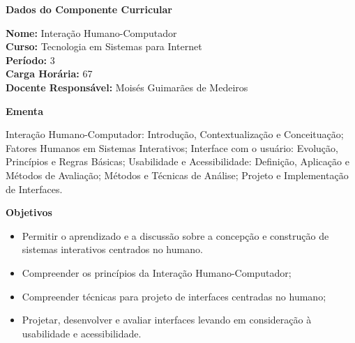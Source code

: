 

\begin{snugshade}\begin{center}\textbf{
    Dados do Componente Curricular
}\end{center}\end{snugshade}

\noindent \textbf{Nome:}                Intera\c{c}\~ao Humano-Computador
\\        \textbf{Curso:}               Tecnologia em Sistemas para Internet
\\        \textbf{Período:}             \unit{3}{\degree}
\\        \textbf{Carga Horária:}       \unit{67}{\hour}
\\        \textbf{Docente Responsável:} Moisés Guimarães de Medeiros


\begin{snugshade}\begin{center}\textbf{
    Ementa
\vphantom{q}}\end{center}\end{snugshade}

\noindent
Interação Humano-Computador: Introdução, Contextualização e Conceituação; Fatores Humanos em Sistemas Interativos; Interface com o usuário: Evolução, Princípios e Regras Básicas; Usabilidade e Acessibilidade: Definição, Aplicação e Métodos de Avaliação; Métodos e Técnicas de Análise; Projeto e Implementação de Interfaces.


\begin{snugshade}\begin{center}\textbf{
    Objetivos
}\end{center}\end{snugshade}

\begin{itemize}

\item Permitir o aprendizado e a discussão sobre a concepção e construção de sistemas interativos centrados no humano.

\item Compreender os princípios da Interação Humano-Computador;

\item Compreender técnicas para projeto de interfaces centradas no humano;

\item Projetar, desenvolver e avaliar interfaces levando em consideração à usabilidade e acessibilidade.

\end{itemize} 

